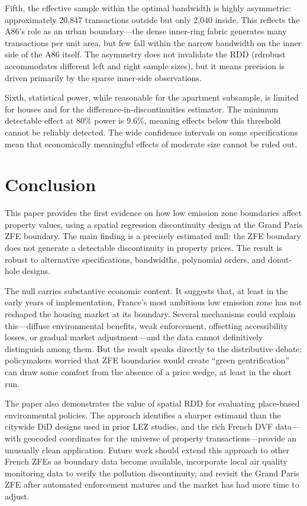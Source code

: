 \documentclass[12pt]{article}
\begin{document}
Fifth, the effective sample within the optimal bandwidth is highly asymmetric: approximately 20,847 transactions outside but only 2,040 inside. This reflects the A86's role as an urban boundary---the dense inner-ring fabric generates many transactions per unit area, but few fall within the narrow bandwidth on the inner side of the A86 itself. The asymmetry does not invalidate the RDD (rdrobust accommodates different left and right sample sizes), but it means precision is driven primarily by the sparse inner-side observations.

Sixth, statistical power, while reasonable for the apartment subsample, is limited for houses and for the difference-in-discontinuities estimator. The minimum detectable effect at 80\% power is 9.6\%, meaning effects below this threshold cannot be reliably detected. The wide confidence intervals on some specifications mean that economically meaningful effects of moderate size cannot be ruled out.


\section{Conclusion}

This paper provides the first evidence on how low emission zone boundaries affect property values, using a spatial regression discontinuity design at the Grand Paris ZFE boundary. The main finding is a precisely estimated null: the ZFE boundary does not generate a detectable discontinuity in property prices. The result is robust to alternative specifications, bandwidths, polynomial orders, and donut-hole designs.

The null carries substantive economic content. It suggests that, at least in the early years of implementation, France's most ambitious low emission zone has not reshaped the housing market at its boundary. Several mechanisms could explain this---diffuse environmental benefits, weak enforcement, offsetting accessibility losses, or gradual market adjustment---and the data cannot definitively distinguish among them. But the result speaks directly to the distributive debate: policymakers worried that ZFE boundaries would create ``green gentrification'' can draw some comfort from the absence of a price wedge, at least in the short run.

The paper also demonstrates the value of spatial RDD for evaluating place-based environmental policies. The approach identifies a sharper estimand than the citywide DiD designs used in prior LEZ studies, and the rich French DVF data---with geocoded coordinates for the universe of property transactions---provide an unusually clean application. Future work should extend this approach to other French ZFEs as boundary data become available, incorporate local air quality monitoring data to verify the pollution discontinuity, and revisit the Grand Paris ZFE after automated enforcement matures and the market has had more time to adjust.
\end{document}
